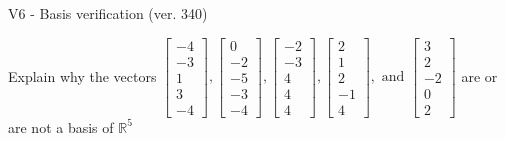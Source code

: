 \begin{exercise}
  \begin{exerciseTitle}V6 - Basis verification (ver. 340)\end{exerciseTitle}
  \begin{exerciseStatement}
    Explain why the vectors \(\left[\begin{array}{r}
-4 \\
-3 \\
1 \\
3 \\
-4
\end{array}\right] , \left[\begin{array}{r}
0 \\
-2 \\
-5 \\
-3 \\
-4
\end{array}\right] , \left[\begin{array}{r}
-2 \\
-3 \\
4 \\
4 \\
4
\end{array}\right] , \left[\begin{array}{r}
2 \\
1 \\
2 \\
-1 \\
4
\end{array}\right] , \text{ and } \left[\begin{array}{r}
3 \\
2 \\
-2 \\
0 \\
2
\end{array}\right]\) are or are not a basis of \(\mathbb{R}^5\)	



\end{exerciseStatement}
\end{exercise}
